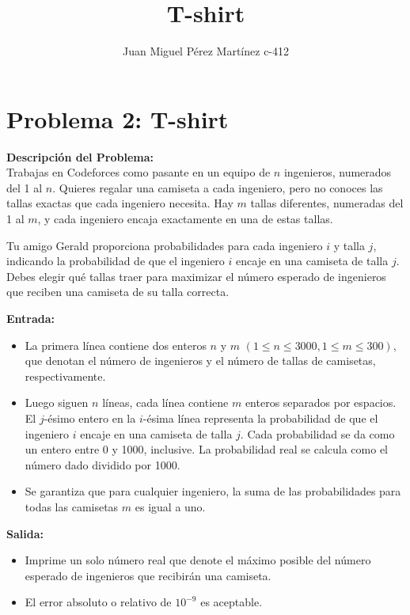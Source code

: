 \documentclass{article}
\title{T-shirt}
\author{Juan Miguel Pérez Martínez c-412}
\begin{document}
\maketitle
\section*{Problema 2: T-shirt}

\textbf{Descripción del Problema:} \\
Trabajas en Codeforces como pasante en un equipo de \(n\) ingenieros, numerados del 1 al \(n\). Quieres regalar una camiseta a cada ingeniero, pero no conoces las tallas exactas que cada ingeniero necesita. Hay \(m\) tallas diferentes, numeradas del 1 al \(m\), y cada ingeniero encaja exactamente en una de estas tallas.

Tu amigo Gerald proporciona probabilidades para cada ingeniero \(i\) y talla \(j\), indicando la probabilidad de que el ingeniero \(i\) encaje en una camiseta de talla \(j\). Debes elegir qué tallas traer para maximizar el número esperado de ingenieros que reciben una camiseta de su talla correcta.

\textbf{Entrada:}
\begin{itemize}
    \item La primera línea contiene dos enteros \(n\) y \(m\) \((1 \leq n \leq 3000, 1 \leq m \leq 300)\), que denotan el número de ingenieros y el número de tallas de camisetas, respectivamente.
    \item Luego siguen \(n\) líneas, cada línea contiene \(m\) enteros separados por espacios. El \(j\)-ésimo entero en la \(i\)-ésima línea representa la probabilidad de que el ingeniero \(i\) encaje en una camiseta de talla \(j\). Cada probabilidad se da como un entero entre 0 y 1000, inclusive. La probabilidad real se calcula como el número dado dividido por 1000.
    \item Se garantiza que para cualquier ingeniero, la suma de las probabilidades para todas las camisetas \(m\) es igual a uno.
\end{itemize}

\textbf{Salida:}
\begin{itemize}
    \item Imprime un solo número real que denote el máximo posible del número esperado de ingenieros que recibirán una camiseta.
    \item El error absoluto o relativo de \(10^{-9}\) es aceptable.
\end{itemize}
\end{document}
